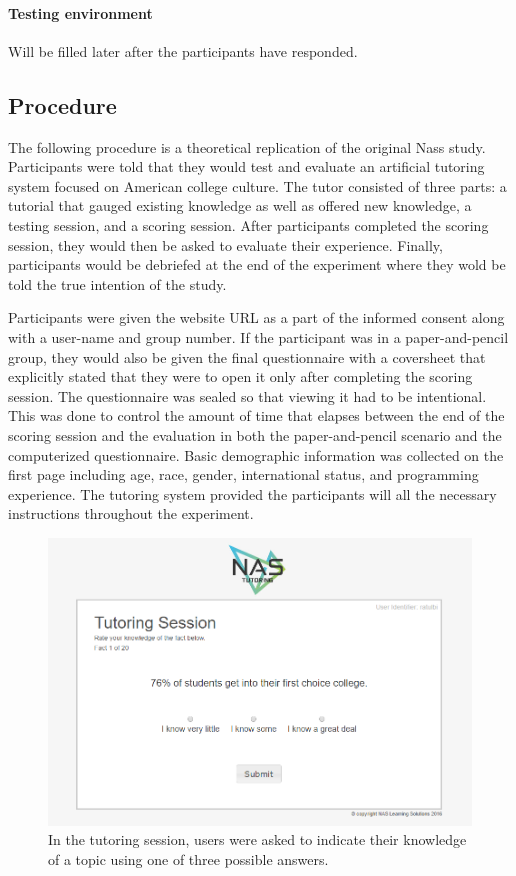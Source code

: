 \documentclass{sig-alternate-05-2015}
\begin{document}
\paragraph{Testing environment}
Will be filled later after the participants have responded.

\subsection{Procedure}

The following procedure is a theoretical replication of the original Nass study.   Participants were told that they would test and evaluate an artificial tutoring system focused on American college culture.  The tutor consisted of three parts: a tutorial that gauged existing knowledge as well as offered new knowledge, a testing session, and a scoring session.  After participants completed the scoring session, they would then be asked to evaluate their experience.  Finally, participants would be debriefed at the end of the experiment where they wold be told the true intention of the study.  

Participants were given the website URL as a part of the informed consent along with a user-name and group number.  If the participant was in a paper-and-pencil group, they would also be given the final questionnaire with a coversheet that explicitly stated that they were to open it only after completing the scoring session.  The questionnaire was sealed so that viewing it had to be intentional.  This was done to control the amount of time that elapses between the end of the scoring session and the evaluation in both the paper-and-pencil scenario and the computerized questionnaire.  Basic demographic information was collected on the first page including age, race, gender, international status, and programming experience. The tutoring system provided the participants will all the necessary instructions throughout the experiment.  

\begin{figure}[!h]
    \includegraphics[width=\linewidth]{figures/website/04_tutoring.png}
    \caption{In the tutoring session, users were asked to indicate their knowledge of a topic using one of three possible answers.}
\end{figure}
\end{document}
